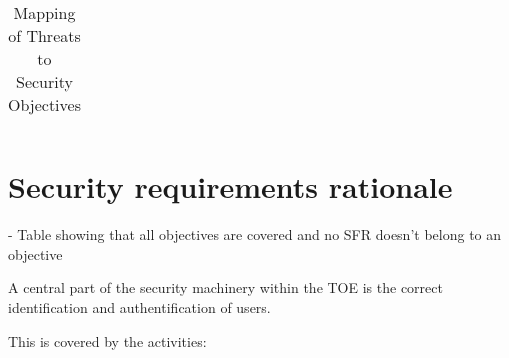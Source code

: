 \documentclass[12pt,english]{scrbook}
\begin{document}
\begin{table}
\begin{tabular}{rRRRRRRRRRRRRRRRRRR}
\bottomrule
  \end{tabular}
  \caption{Mapping of Threats to Security Objectives}
\end{table}

\begin{quote}
\begin{quote}

\end{quote}

\end{quote}





\section{Security requirements rationale}

- Table showing that all objectives are covered and no SFR doesn't belong to an objective



    A central part of the security machinery within the TOE is the correct
    identification and authentification of users.

    This is covered by the activities:
\end{document}
